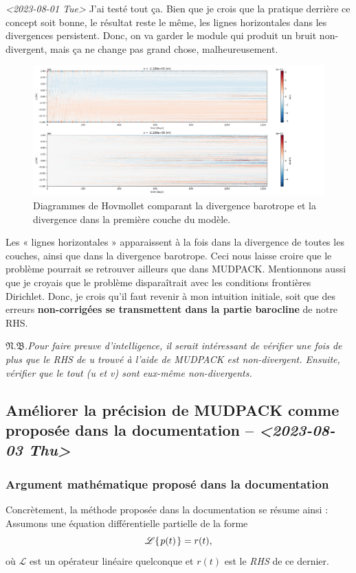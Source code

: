 \documentclass[10pt]{article}
\numberwithin{equation}{section}
\newcommand{\pt}{\hspace{1pt}} %
\newcommand{\nb}{\underline{{\footnotesize\EightStarConvex}\pt $\mathfrak{N.B.}$\vphantom{p}}\hspace{3pt}}
\begin{document}
\textit{<2023-08-01 Tue> } J'ai testé tout ça.
Bien que je crois que la pratique derrière ce concept soit bonne, le résultat reste le même, les lignes horizontales dans les divergences persistent.
Donc, on va garder le module qui produit un bruit non-divergent, mais ça ne change pas grand chose, malheureusement.

\begin{figure}[htbp]
\centering
\includegraphics[width=.9\linewidth]{figures/debuggage/2023_08_03_comp_divergences.png}
\caption{Diagrammes de Hovmollet comparant la divergence barotrope et la divergence dans la première couche du modèle.}
\end{figure}

Les « lignes horizontales » apparaissent à la fois dans la divergence de toutes les couches, ainsi que dans la divergence barotrope.
Ceci nous laisse croire que le problème pourrait se retrouver ailleurs que dans MUDPACK.
Mentionnons aussi que je croyais que le problème disparaîtrait avec les conditions frontières Dirichlet.
Donc, je crois qu'il faut revenir à mon intuition initiale, soit que des erreurs \textbf{non-corrigées se transmettent dans la partie barocline} de notre RHS.\bigskip

\nb \emph{Pour faire preuve d'intelligence, il serait intéressant de vérifier une fois de plus que le RHS de u trouvé à l'aide de MUDPACK est non-divergent.
Ensuite, vérifier que le tout (u et v) sont eux-même non-divergents.}
\subsection{Améliorer la précision de MUDPACK comme proposée dans la documentation -- \textit{<2023-08-03 Thu>}}
\label{sec:org03d091d}

\subsubsection{Argument mathématique proposé dans la documentation}
\label{sec:org444a74d}
Concrètement, la méthode proposée dans la documentation se résume ainsi :
Assumons une équation différentielle partielle de la forme
\begin{equation}
   \mathscr{L}\qty{\pt p(t)\pt} = r(t),
\end{equation}
où \(\mathscr{L}\) est un opérateur linéaire quelconque et \(r(t)\) est le \emph{RHS} de ce dernier.\bigskip
\end{document}
